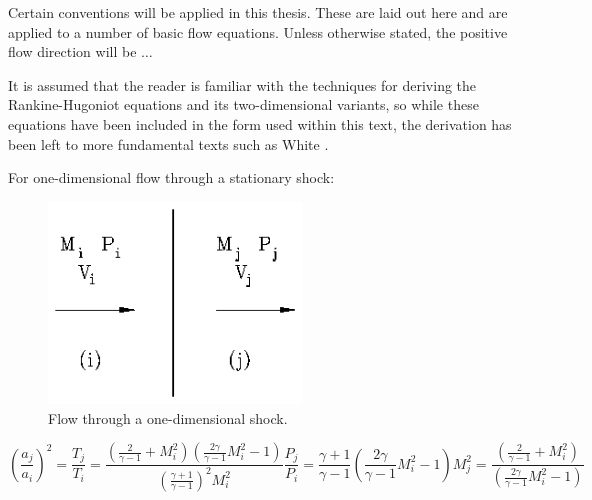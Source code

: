 Certain conventions will be applied in this thesis. These are laid out here and are applied to a
number of basic flow equations. Unless otherwise stated, the positive flow direction will be
$\ldots$

It is assumed that the reader is familiar with the techniques for deriving the Rankine-Hugoniot
equations and its two-dimensional variants, so while these equations have been included in the
form used within this text, the derivation has been left to more fundamental texts such as
White \cite{Knuth1968}.

For one-dimensional flow through a stationary shock:

\begin{figure}[htb]
\begin{center}
\includegraphics[width=0.6\textwidth]{dissertation/figures/1fig6.eps}
\caption{Flow through a one-dimensional shock.}
\label{fig:1fig6}
\end{center}
\end{figure}

\begin{subequations} \label{eq:r-hn}
\begin{equation}
\left( \frac{a_j}{a_i}\right) ^2=\frac{T_j}{T_i}=\frac{\left( \frac2{\gamma-1}+M_i^2\right)
\left( \frac{2\gamma }{\gamma -1}M_i^2-1\right) }{\left( \frac{\gamma +1}{\gamma -1}
\right) ^2M_i^2}  \label{eq:r-hn1}
\end{equation}

\begin{equation}
\frac{P_j}{P_i}=\frac{\gamma +1}{\gamma -1}\left( \frac{2\gamma }{\gamma -1}M_i^2-1
\right)  \label{eq:r-hn2}
\end{equation}

\begin{equation}
M_j^2=\frac{\left( \frac 2{\gamma -1}+M_i^2\right) }{\left( \frac{2\gamma }{\gamma -1}
M_i^2-1\right) }  \label{eq:r-hn3}
\end{equation}
\end{subequations}

